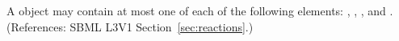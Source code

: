 A \Reaction object may contain at most one of each of the following
elements: , ,
, and .  (References: SBML L3V1
Section~\ref{sec:reactions}.)
